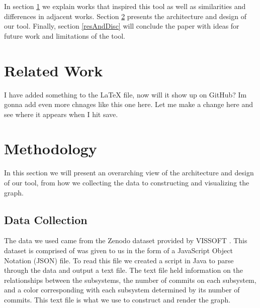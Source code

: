 \documentclass[conference]{IEEEtran}
\begin{document}

In section \ref{relWork} we explain works that inspired this tool as well as similarities and differences in adjacent works. Section \ref{method} presents the architecture and design of our tool. Finally, section \ref{resAndDisc} will conclude the paper with ideas for future work and limitations of the tool.




\section{Related Work}
\label{relWork}


I have added something to the LaTeX file, now will it show up on GitHub? Im gonna add even more chnages like this one here. Let me make a change here and see where it appears when I hit save.

\section{Methodology}
\label{method}

In this section we will present an overarching view of the architecture and design of our tool, from how we collecting the data to constructing and visualizing the graph.

\subsection{Data Collection}
The data we used came from the Zenodo dataset provided by VISSOFT \cite{zenodo}. This dataset is comprised of was given to us in the form of a JavaScript Object Notation (JSON) file. To read this file we created a script in Java to parse through the data and output a text file. The text file held information on the relationships between the subsystems, the number of commits on each subsystem, and a color corresponding with each subsystem determined by its number of commits. This text file is what we use to construct and render the graph.
\end{document}
